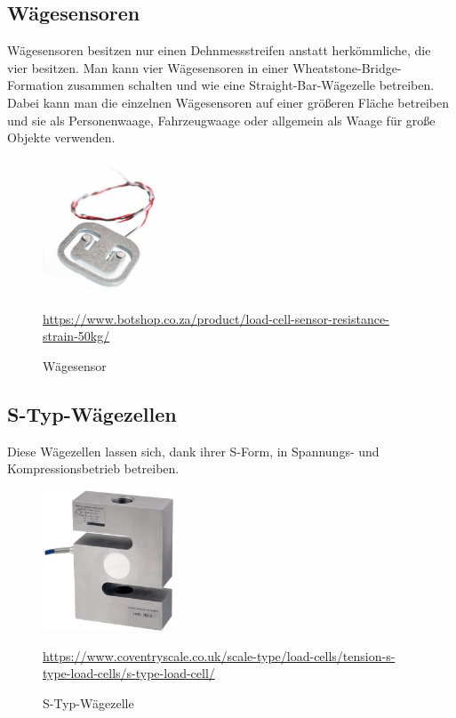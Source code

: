 \subsection{Wägesensoren}
Wägesensoren besitzen nur einen Dehnmessstreifen anstatt herkömmliche, die vier besitzen. Man kann vier Wägesensoren in einer Wheatstone-Bridge-Formation zusammen schalten und wie eine Straight-Bar-Wägezelle betreiben. Dabei kann man die einzelnen Wägesensoren auf einer größeren Fläche betreiben und sie als Personenwaage, Fahrzeugwaage oder allgemein als Waage für große Objekte verwenden.
\begin{figure}[ht]
    \center
    \includegraphics[width=4cm]{Bilder/waegezelle-waegesensor.jpg}\\
    \caption{Wägesensor}
    \begin{center} \quelle\url{https://www.botshop.co.za/product/load-cell-sensor-resistance-strain-50kg/} \end{center}
\end{figure}
\subsection{S-Typ-Wägezellen}
Diese Wägezellen lassen sich, dank ihrer S-Form, in Spannungs- und Kompressionsbetrieb betreiben.
\begin{figure}[ht]
    \center
    \includegraphics[width=4cm]{Bilder/waegezelle-s_typ.jpg}\\
    \caption{S-Typ-Wägezelle}
    \begin{center} \quelle\url{https://www.coventryscale.co.uk/scale-type/load-cells/tension-s-type-load-cells/s-type-load-cell/} \end{center}
\end{figure}
\newpage
